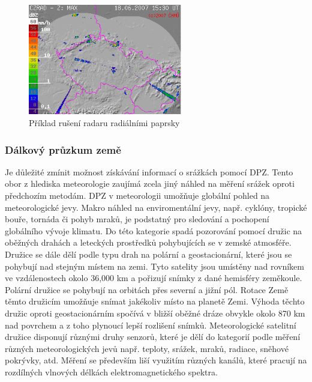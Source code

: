 \documentclass[a4paper,12pt]{article}
\begin{document}
\begin{description}
\begin{figure}[h!]
    \centering
    \includegraphics[width=0.6\textwidth]{./img/srazky/0706181530-gif.png}
    \caption[Rušení radaru]{\centering Příklad rušení radaru radiálními paprsky \footnotemark }
\end{figure}



\end{description}


\subsubsection{Dálkový průzkum země}
Je důležité zmínit možnost získávání informací o srážkách pomocí \ac{DPZ}. Tento obor z hlediska meteorologie zaujímá zcela jiný náhled na měření srážek oproti předchozím metodám. \acs{DPZ} v meteorologii umožňuje globální pohled na meteorologické jevy. Makro náhled na enviromentální jevy, např. cyklóny, tropické bouře, tornáda či pohyb mraků, je podstatný pro sledování a pochopení globálního vývoje klimatu. Do této kategorie spadá pozorování pomocí družic na oběžných drahách a leteckých prostředků pohybujících se v zemské atmosféře. Družice se dále dělí podle typu drah na polární a geostacionární, které jsou se pohybují nad stejným místem na zemi. Tyto satelity jsou umístěny nad rovníkem ve vzdálenostech okolo 36,000 km a pořizují snímky z dané hemisféry zeměkoule. Polární družice se pohybují na orbitách přes severní a jižní pól. Rotace Země těmto družicím umožňuje snímat jakékoliv místo na planetě Zemi. Výhoda těchto družic oproti geostacionárním spočívá v bližší oběžné dráze obvykle okolo 870 km nad povrchem a z toho plynoucí lepší rozlišení snímků. 
Meteorologické satelitní družice disponují různými druhy senzorů, které je dělí do kategorií podle měření různých meteorologických jevů např. teploty, srážek, mraků, radiace, sněhové pokrývky, atd. Měření se především liší  využitím různých kanálů, které pracují na rozdílných vlnových délkách elektromagnetického spektra.
 
\end{document}
